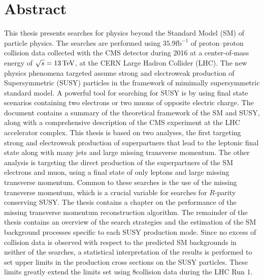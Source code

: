 \chapter*{Abstract}
\noindent\justify
This thesis presents searches for physics beyond the Standard Model (SM) of particle physics. 
The searches are performed using $35.9\mathrm{fb^{-1}}$ of proton--proton collision data collected with the CMS detector during 2016 at a center-of-mass energy of $\sqrt{s}=13\,\text{Te\hspace{-.08em}V}$, at the CERN Large Hadron Collider (LHC). 
The new physics phenomena targeted assume strong and electroweak production of Supersymmetric (SUSY) particles in the framework of mimimally supersymmetric standard model. 
A powerful tool for searching for SUSY is by using final state scenarios containing two electrons or two muons of opposite electric charge.  
\newpara
\noindent\justify
The document contains a summary of the theoretical framework of the SM and SUSY, along with a comprehensive description of the CMS experiment at the LHC accelerator complex. 
This thesis is based on two analyses, the first targeting strong and electroweak production of superpartners that lead to the leptonic final state along with many jets and large missing transverse momentum. 
The other analysis is targeting the direct production of the superpartners of the SM electrons and muon, using a final state of only leptons and large missing transverse momentum. 
Common to these searches is the use of the missing transverse momentum, which is a crucial variable for searches for $R$-parity conserving SUSY. 
\newpara
\noindent\justify
The thesis contains a chapter on the performance of the missing transverse momentum reconstruction algorithm.  
The remainder of the thesis contains an overview of the search strategies and the estimation of the SM background processes specific to each SUSY production mode. 
\newpara
\noindent\justify
Since no excess of collision data is observed with respect to the predicted SM backgrounds in neither of the searches, a statistical interpretation of the results is performed to set upper limits in the production cross sections on the SUSY particles. 
These limits greatly extend the limits set using 8\TeV collision data during the LHC Run 1. 
